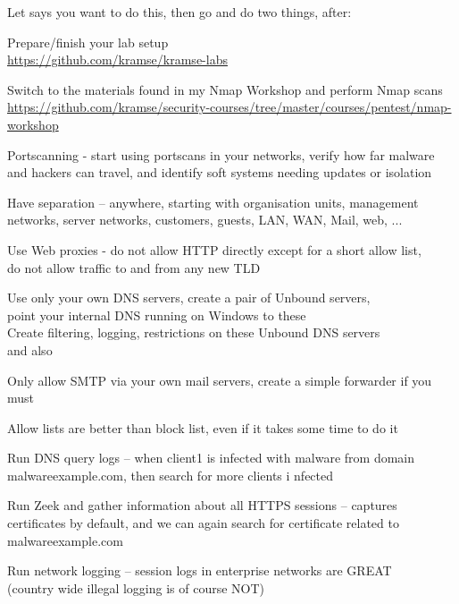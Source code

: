 \documentclass[Screen16to9,17pt]{foils}
\begin{document}

\begin{list2}
\item Let says you want to do this, then go and do two things, after:
\item Prepare/finish your lab setup\\
\url{https://github.com/kramse/kramse-labs}

\item Switch to the materials found in my Nmap Workshop and perform Nmap scans\\
\url{https://github.com/kramse/security-courses/tree/master/courses/pentest/nmap-workshop}
\end{list2}





\begin{list2}
\item Portscanning - start using portscans in your networks, verify how far malware and hackers can travel, and identify soft systems needing updates or isolation
\item Have separation -- anywhere, starting with organisation units, management networks, server networks, customers, guests, LAN, WAN, Mail, web, ...
\item Use Web proxies - do not allow HTTP directly except for a short allow list, \\
do not allow traffic to and from any new TLD
\item Use only your own DNS servers, create a pair of Unbound servers, \\
point your internal DNS running on Windows to these\\
Create filtering, logging, restrictions on these Unbound DNS servers\\
 and also 
\item Only allow SMTP via your own mail servers, create a simple forwarder if you must
\end{list2}

Allow lists are better than block list, even if it takes some time to do it



\begin{list2}
\item Run DNS query logs -- when client1 is infected with malware from domain malwareexample.com, then search for more clients i
nfected
\item Run Zeek and gather information about all HTTPS sessions -- captures certificates by default, and we can again search for
certificate related to malwareexample.com
\item Run network logging -- session logs in enterprise networks are GREAT \\
(country wide illegal logging is of course NOT)
\end{list2}
\end{document}
